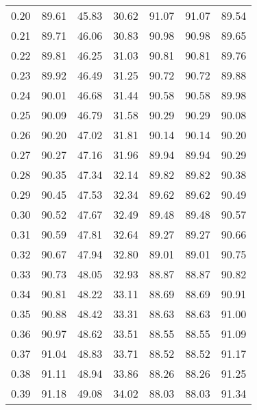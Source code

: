 \begin{tabular}{|c|c|c|c|c|c|c|}
      0.20 &     89.61 &     45.83 &      30.62 &   91.07 &      91.07 &         89.54 \\
      0.21 &     89.71 &     46.06 &      30.83 &   90.98 &      90.98 &         89.65 \\
      0.22 &     89.81 &     46.25 &      31.03 &   90.81 &      90.81 &         89.76 \\
      0.23 &     89.92 &     46.49 &      31.25 &   90.72 &      90.72 &         89.88 \\
      0.24 &     90.01 &     46.68 &      31.44 &   90.58 &      90.58 &         89.98 \\
      0.25 &     90.09 &     46.79 &      31.58 &   90.29 &      90.29 &         90.08 \\
      0.26 &     90.20 &     47.02 &      31.81 &   90.14 &      90.14 &         90.20 \\
      0.27 &     90.27 &     47.16 &      31.96 &   89.94 &      89.94 &         90.29 \\
      0.28 &     90.35 &     47.34 &      32.14 &   89.82 &      89.82 &         90.38 \\
      0.29 &     90.45 &     47.53 &      32.34 &   89.62 &      89.62 &         90.49 \\
      0.30 &     90.52 &     47.67 &      32.49 &   89.48 &      89.48 &         90.57 \\
      0.31 &     90.59 &     47.81 &      32.64 &   89.27 &      89.27 &         90.66 \\
      0.32 &     90.67 &     47.94 &      32.80 &   89.01 &      89.01 &         90.75 \\
      0.33 &     90.73 &     48.05 &      32.93 &   88.87 &      88.87 &         90.82 \\
      0.34 &     90.81 &     48.22 &      33.11 &   88.69 &      88.69 &         90.91 \\
      0.35 &     90.88 &     48.42 &      33.31 &   88.63 &      88.63 &         91.00 \\
      0.36 &     90.97 &     48.62 &      33.51 &   88.55 &      88.55 &         91.09 \\
      0.37 &     91.04 &     48.83 &      33.71 &   88.52 &      88.52 &         91.17 \\
      0.38 &     91.11 &     48.94 &      33.86 &   88.26 &      88.26 &         91.25 \\
      0.39 &     91.18 &     49.08 &      34.02 &   88.03 &      88.03 &         91.34 \\

\end{tabular}
